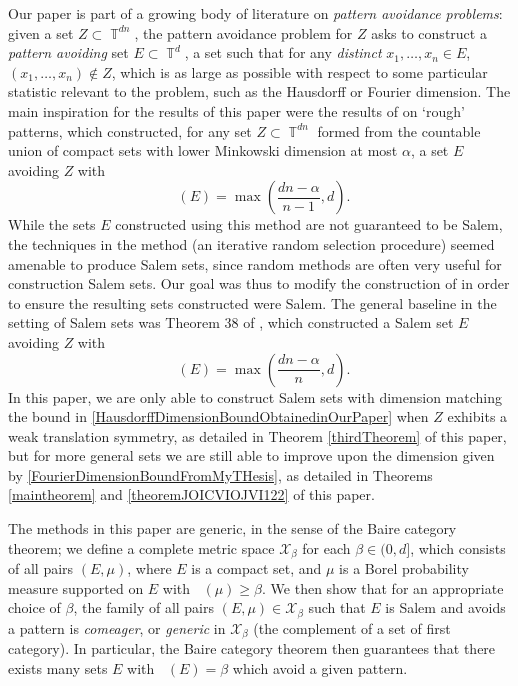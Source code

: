 \documentclass[dvipsnames,letterpaper,12pt]{article}
\numberwithin{equation}{section}
\DeclareMathOperator{\hausdim}{\dim_{\mathbb{H}}}
\DeclareMathOperator{\fordim}{\dim_{\mathbb{F}}}
\DeclareMathOperator{\TT}{\mathbb{T}}
\numberwithin{theorem}{section}
\begin{document}
Our paper is part of a growing body of literature on \emph{pattern avoidance problems}: given a set $Z \subset \TT^{dn}$, the pattern avoidance problem for $Z$ asks to construct a \emph{pattern avoiding} set $E \subset \TT^d$, a set such that for any \emph{distinct} $x_1,\dots,x_n \in E$, $(x_1,\dots,x_n) \not \in Z$, which is as large as possible with respect to some particular statistic relevant to the problem, such as the Hausdorff or Fourier dimension. The main inspiration for the results of this paper were the results of \cite{OurPaper} on `rough' patterns, which constructed, for any set $Z \subset \TT^{dn}$ formed from the countable union of compact sets with lower Minkowski dimension at most $\alpha$, a set $E$ avoiding $Z$ with
%
\begin{equation} \label{HausdorffDimensionBoundObtainedinOurPaper}
    \hausdim(E) = \max\left( \frac{dn - \alpha}{n - 1}, d \right).
\end{equation}
%
While the sets $E$ constructed using this method are not guaranteed to be Salem, the techniques in the method (an iterative random selection procedure) seemed amenable to produce Salem sets, since random methods are often very useful for construction Salem sets. Our goal was thus to modify the construction of \cite{OurPaper} in order to ensure the resulting sets constructed were Salem. The general baseline in the setting of Salem sets was Theorem 38 of \cite{MyThesis}, which constructed a Salem set $E$ avoiding $Z$ with
%
\begin{equation} \label{FourierDimensionBoundFromMyTHesis}
    \fordim(E) = \max \left( \frac{dn - \alpha}{n}, d \right).
\end{equation}
%
In this paper, we are only able to construct Salem sets with dimension matching the bound in \eqref{HausdorffDimensionBoundObtainedinOurPaper} when $Z$ exhibits a weak translation symmetry, as detailed in Theorem \ref{thirdTheorem} of this paper, but for more general sets we are still able to improve upon the dimension given by \eqref{FourierDimensionBoundFromMyTHesis}, as detailed in Theorems \ref{maintheorem} and \ref{theoremJOICVIOJVI122} of this paper.

The methods in this paper are generic, in the sense of the Baire category theorem; we define a complete metric space $\mathcal{X}_\beta$ for each $\beta \in (0,d]$, which consists of all pairs $(E,\mu)$, where $E$ is a compact set, and $\mu$ is a Borel probability measure supported on $E$ with $\fordim(\mu) \geq \beta$. We then show that for an appropriate choice of $\beta$, the family of all pairs $(E,\mu) \in \mathcal{X}_\beta$ such that $E$ is Salem and avoids a pattern is \emph{comeager}, or \emph{generic} in $\mathcal{X}_\beta$ (the complement of a set of first category). In particular, the Baire category theorem then guarantees that there exists many sets $E$ with $\fordim(E) = \beta$ which avoid a given pattern.
\end{document}
